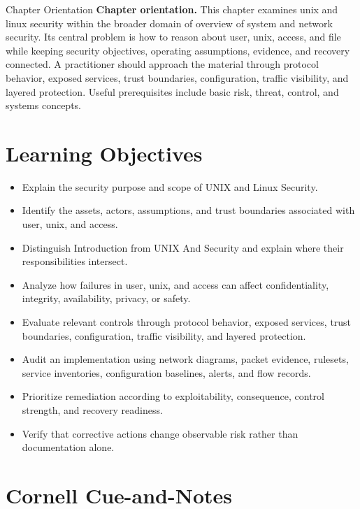 \documentclass[11pt,letterpaper]{article}
\title{\CornellDocumentTitle}
\author{}
\date{}
\begin{document}
\maketitle
\begin{CornellOverviewBox}{Chapter Orientation}
\textbf{Chapter orientation.} This chapter examines unix and linux security within the broader domain of overview of system and network security. Its central problem is how to reason about user, unix, access, and file while keeping security objectives, operating assumptions, evidence, and recovery connected. A practitioner should approach the material through protocol behavior, exposed services, trust boundaries, configuration, traffic visibility, and layered protection. Useful prerequisites include basic risk, threat, control, and systems concepts.
\end{CornellOverviewBox}
\section*{Learning Objectives}
\begin{itemize}
\item Explain the security purpose and scope of UNIX and Linux Security.
\item Identify the assets, actors, assumptions, and trust boundaries associated with user, unix, and access.
\item Distinguish Introduction from UNIX And Security and explain where their responsibilities intersect.
\item Analyze how failures in user, unix, and access can affect confidentiality, integrity, availability, privacy, or safety.
\item Evaluate relevant controls through protocol behavior, exposed services, trust boundaries, configuration, traffic visibility, and layered protection.
\item Audit an implementation using network diagrams, packet evidence, rulesets, service inventories, configuration baselines, alerts, and flow records.
\item Prioritize remediation according to exploitability, consequence, control strength, and recovery readiness.
\item Verify that corrective actions change observable risk rather than documentation alone.
\end{itemize}
\section*{Cornell Cue-and-Notes}
\end{document}
